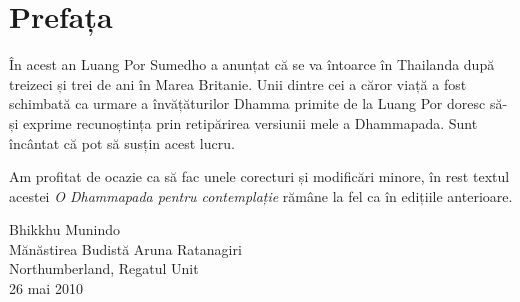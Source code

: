 
\chapter[Prefața ediției a treia (2010]{Prefața}

În acest an Luang Por Sumedho a anunțat că se va întoarce în Thailanda după treizeci și trei de ani în Marea Britanie. Unii dintre cei a căror viață a fost schimbată ca urmare a învățăturilor Dhamma primite de la Luang Por doresc să-și exprime recunoștința prin retipărirea versiunii mele a Dhammapada. Sunt încântat că pot să susțin acest lucru.

Am profitat de ocazie ca să fac unele corecturi și modificări minore, în rest textul acestei \emph{O Dhammapada pentru contemplație} rămâne la fel ca în edițiile anterioare.

\bigskip

{\raggedleft
Bhikkhu Munindo\\
Mănăstirea Budistă Aruna Ratanagiri\\
Northumberland, Regatul Unit\\
26 mai 2010
\par}
